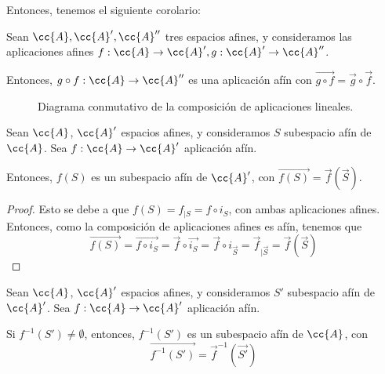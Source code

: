 Entonces, tenemos el siguiente corolario:
\begin{prop} Sean $\cc{A},\cc{A}', \cc{A}''$ tres espacios afines, y consideramos las aplicaciones afines $f:\cc{A}\to \cc{A}', g:\cc{A}'\to \cc{A}''$.

Entonces, $g\circ f:\cc{A}\to \cc{A}''$ es una aplicación afín con $\vec{g\circ f} = \vec{g}\circ \vec{f}$.
\begin{figure}[H]
    \centering
    \caption{Diagrama conmutativo de la composición de aplicaciones lineales.}
    \label{fig:cd:ApLineal_Comp}
\end{figure}
\end{prop}

\begin{coro}
    Sean $\cc{A}$, $\cc{A}'$ espacios afines, y consideramos $S$ subespacio afín de $\cc{A}$. Sea $f:\cc{A}\to \cc{A}'$ aplicación afín.
    
    Entonces, $f(S)$ es un subespacio afín de $\cc{A}'$, con $\vec{f(S)} = \vec{f}\left(\vec{S}\right)$.
\end{coro}
\begin{proof}
    Esto se debe a que $f(S)=f_{\big| S} = f\circ i_S$, con ambas aplicaciones afines. Entonces, como la composición de aplicaciones afines es afín, tenemos que $$\vec{f(S)}=\vec{f\circ i_S} = \vec{f}\circ \vec{i_S} = \vec{f}\circ i_{\vec{S}} = \vec{f}_{\big| \vec{S}} = \vec{f}\left(\vec{S}\right)$$
\end{proof}


\begin{coro}
    Sean $\cc{A}$, $\cc{A}'$ espacios afines, y consideramos $S'$ subespacio afín de $\cc{A}'$. Sea $f:\cc{A}\to \cc{A}'$ aplicación afín.
    
    Si ${f}^{-1}(S')\neq \emptyset$, entonces, $f^{-1}(S')$ es un subespacio afín de $\cc{A}$, con
    \begin{equation*}
        \vec{f^{-1}(S')} = \vec{f}^{-1}\left(\vec{S'}\right)
    \end{equation*}
\end{coro}

